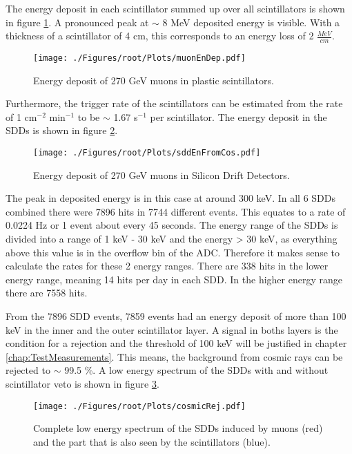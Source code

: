 The energy deposit in each scintillator summed up over all scintillators is shown in figure \ref{fig:muEnDepScin}. A pronounced peak at $\sim$ 8 MeV deposited energy is visible. With a thickness of a scintillator of 4 cm, this corresponds to an energy loss of 2 $\frac{MeV}{cm}$. 
\begin{figure}[h]
 \centering
 \texttt{[image: ./Figures/root/Plots/muonEnDep.pdf]}
 \caption{Energy deposit of 270 GeV muons in plastic scintillators.}
 \label{fig:muEnDepScin}
\end{figure}

Furthermore, the trigger rate of the scintillators can be estimated from the rate of 1 cm$^{-2}$ min$^{-1}$ to be $\sim$ 1.67 s$^{-1}$ per scintillator. The energy deposit in the SDDs is shown in figure \ref{fig:muEnDepSDD}. 
\begin{figure}[h]
 \centering
 \texttt{[image: ./Figures/root/Plots/sddEnFromCos.pdf]}
 \caption{Energy deposit of 270 GeV muons in Silicon Drift Detectors.}
 \label{fig:muEnDepSDD}
\end{figure}
The peak in deposited energy is in this case at around 300 keV. In all 6 SDDs combined there were 7896 hits in 7744 different events. This equates to a rate of 0.0224 Hz or 1 event about every 45 seconds. The energy range of the SDDs is divided into a range of 1 keV - 30 keV and the energy > 30 keV, as everything above this value is in the overflow bin of the ADC. Therefore it makes sense to calculate the rates for these 2 energy ranges. There are 338 hits in the lower energy range, meaning 14 hits per day in each SDD. In the higher energy range there are 7558 hits.

From the 7896 SDD events, 7859 events had an energy deposit of more than 100 keV in the inner and the outer scintillator layer. A signal in boths layers is the condition for a rejection and the threshold of 100 keV will be justified in chapter \ref{chap:TestMeasurements}. This means, the background from cosmic rays can be rejected to $\sim$ 99.5 \%. A low energy spectrum of the SDDs with and without scintillator veto is shown in figure \ref{fig:scintVeto}.
\begin{figure}[h]
 \centering
 \texttt{[image: ./Figures/root/Plots/cosmicRej.pdf]}
 \caption{Complete low energy spectrum of the SDDs induced by muons (red) and the part that is also seen by the scintillators (blue).}
 \label{fig:scintVeto}
\end{figure}

